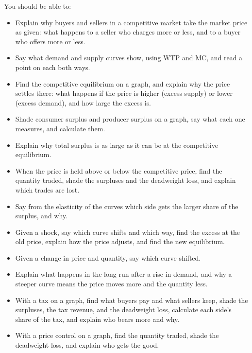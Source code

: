 \documentclass[11pt]{article}
\newcommand{\block}[1]{\needspace{4\baselineskip}\par\vspace{4pt}\noindent{\fontsize{13}{16}\selectfont\bfseries\color{accent}#1}\par\vspace{-5pt}\noindent{\color{accent}\rule{\linewidth}{0.4pt}}\par\vspace{1pt}}
\begin{document}
\block{What You Should Know}
You should be able to:
\begin{itemize}
\item Explain why buyers and sellers in a competitive market take the market price as given: what happens to a seller who charges more or less, and to a buyer who offers more or less.
\item Say what demand and supply curves show, using WTP and MC, and read a point on each both ways.
\item Find the competitive equilibrium on a graph, and explain why the price settles there: what happens if the price is higher (excess supply) or lower (excess demand), and how large the excess is.
\item Shade consumer surplus and producer surplus on a graph, say what each one measures, and calculate them.
\item Explain why total surplus is as large as it can be at the competitive equilibrium.
\item When the price is held above or below the competitive price, find the quantity traded, shade the surpluses and the deadweight loss, and explain which trades are lost.
\item Say from the elasticity of the curves which side gets the larger share of the surplus, and why.
\item Given a shock, say which curve shifts and which way, find the excess at the old price, explain how the price adjusts, and find the new equilibrium.
\item Given a change in price and quantity, say which curve shifted.
\item Explain what happens in the long run after a rise in demand, and why a steeper curve means the price moves more and the quantity less.
\item With a tax on a graph, find what buyers pay and what sellers keep, shade the surpluses, the tax revenue, and the deadweight loss, calculate each side's share of the tax, and explain who bears more and why.
\item With a price control on a graph, find the quantity traded, shade the deadweight loss, and explain who gets the good.
\end{itemize}
\end{document}
